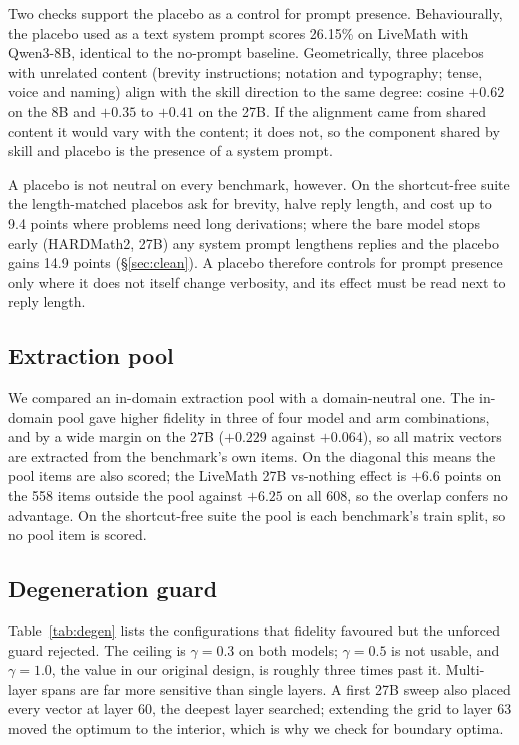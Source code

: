 \documentclass[11pt]{article}
\begin{document}
Two checks support the placebo as a control for prompt presence. Behaviourally, the placebo used as a
text system prompt scores 26.15\% on LiveMath with Qwen3-8B, identical to the no-prompt baseline.
Geometrically, three placebos with unrelated content (brevity instructions; notation and typography;
tense, voice and naming) align with the skill direction to the same degree: cosine $+0.62$ on the 8B
and $+0.35$ to $+0.41$ on the 27B. If the alignment came from shared content it would vary with the
content; it does not, so the component shared by skill and placebo is the presence of a system
prompt.

A placebo is not neutral on every benchmark, however. On the shortcut-free suite the length-matched
placebos ask for brevity, halve reply length, and cost up to 9.4 points where problems need long
derivations; where the bare model stops early (HARDMath2, 27B) any system prompt lengthens replies
and the placebo gains 14.9 points (\S\ref{sec:clean}). A placebo therefore controls for prompt presence only where it does
not itself change verbosity, and its effect must be read next to reply length.

\subsection{Extraction pool}
\label{app:pool}

We compared an in-domain extraction pool with a domain-neutral one. The in-domain pool gave higher
fidelity in three of four model and arm combinations, and by a wide margin on the 27B ($+0.229$
against $+0.064$), so all matrix vectors are extracted from the benchmark's own items. On the diagonal
this means the pool items are also scored; the LiveMath 27B vs-nothing effect is $+6.6$ points on the
558 items outside the pool against $+6.25$ on all 608, so the overlap confers no advantage. On the
shortcut-free suite the pool is each benchmark's train split, so no pool item is scored.

\subsection{Degeneration guard}
\label{app:degen}

Table~\ref{tab:degen} lists the configurations that fidelity favoured but the unforced guard
rejected. The ceiling is $\gamma=0.3$ on both models; $\gamma=0.5$ is not usable, and $\gamma=1.0$,
the value in our original design, is roughly three times past it. Multi-layer spans are far more
sensitive than single layers. A first 27B sweep also placed every vector at layer 60, the deepest
layer searched; extending the grid to layer 63 moved the optimum to the interior, which is why we
check for boundary optima.
\end{document}
